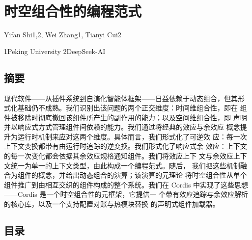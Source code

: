 

\section{时空组合性的编程范式}\label{a-programming-paradigm-for-spatiotemporal-composability}

Yifan Shi1,2, Wei Zhang1, Tianyi Cui2

1Peking University 2DeepSeek-AI

\subsection{摘要}\label{abstract}

现代软件——从插件系统到自演化智能体框架——日益依赖于动态组合，但其形
式化基础仍不成熟。我们识别出该问题的两个正交维度：时间维组合性，即在
组件被移除时彻底撤回该组件所产生的副作用的能力；以及空间维组合性，即
声明并以响应式方式管理组件间依赖的能力。我们通过将经典的效应与余效应
概念提升为运行时机制来应对这两个维度。具体而言，我们形式化了可逆效
应：每一次上下文变换都带有由运行时追踪的逆变换。我们形式化了响应式余
效应：上下文的每一次变化都会依据其余效应规格通知组件。我们将效应上下
文与余效应上下文统一为单一的上下文类型，由此构成一个编程范式。随后，
我们把这些机制融合为组件的概念，并给出动态组合的演算；该演算的元理论
将时空组合性从单个组件推广到由相互交织的组件构成的整个系统。我们在
Cordis 中实现了这些思想——Cordis 是一个时空组合性的元框架，它提供一
个带有效应追踪与余效应解析的核心库，以及一个支持配置对账与热模块替换
的声明式组件加载器。

\subsection{目录}\label{contents}

